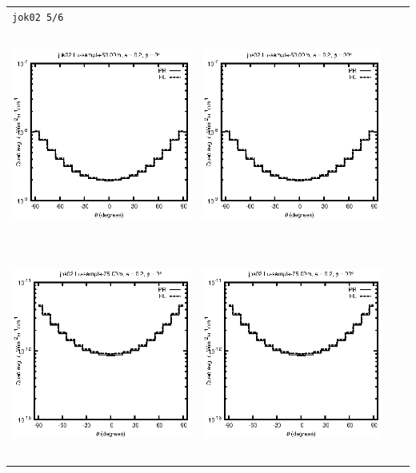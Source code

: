 \documentclass[10pt,a4paper]{article}
\begin{document}
\begin{adjustwidth}{-1.2in}{-1.2in}
\begin{tabular}{c c c c}
\multicolumn{4}{l}{\texttt{jok02 5/6}} \\
\includegraphics[height=7cm]{../eps/jok02_Lu_sample_50.00m_fwd.eps} &
\includegraphics[height=7cm]{../eps/jok02_Lu_sample_50.00m_cross.eps} \\
\includegraphics[height=7cm]{../eps/jok02_Lu_sample_75.00m_fwd.eps} &
\includegraphics[height=7cm]{../eps/jok02_Lu_sample_75.00m_cross.eps} \\

\end{tabular}
\end{adjustwidth}
\end{document}
